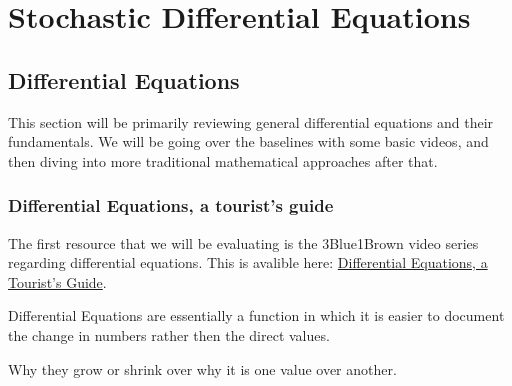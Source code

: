 \documentclass[10pt, oneside]{report}
\begin{document}
\chapter{Stochastic Differential Equations}
\section{Differential Equations}
This section will be primarily reviewing general differential equations and their fundamentals.  We will be going over the baselines with some basic videos, and then diving into more traditional mathematical approaches after that.  
\subsection{Differential Equations, a tourist's guide}
The first resource that we will be evaluating is the 3Blue1Brown video series regarding differential equations. This is avalible here: \href{https://www.youtube.com/watch?v=p_di4Zn4wz4&list=PLZHQObOWTQDNPOjrT6KVlfJuKtYTftqH6}{Differential Equations, a Tourist's Guide}.

Differential Equations are essentially a function in which it is easier to document the change in numbers rather then the direct values.  

Why they grow or shrink over why it is one value over another.
\end{document}
